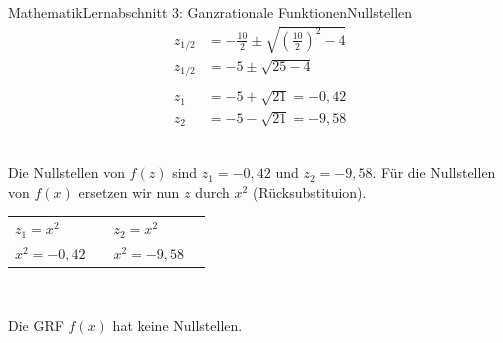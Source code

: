 \documentclass[11pt,twocolumn,oneside,openany,headings=optiontotoc,11pt,numbers=noenddot]{article}
\begin{document}
\begin{worksheet}{Mathematik}{Lernabschnitt 3: Ganzrationale Funktionen}{Nullstellen}
\begin{align*}
		z_{1/2} & = -\frac{10}{2} \pm \sqrt{\left(\frac{10}{2}\right)^2 - 4}\\
		z_{1/2} & = -5 \pm \sqrt{25 - 4}\\
		\\
		z_1 & = -5 + \sqrt{21} = -0,42\\
		z_2 & = -5 - \sqrt{21} = -9,58
		\end{align*}\\
		\par\noindent
		Die Nullstellen von \(f(z)\) sind \(z_1=-0,42\) und \(z_2=-9,58\). Für die Nullstellen von \(f(x)\) ersetzen wir nun \(z\) durch \(x^2\) (Rücksubstituion).\\
		\par\noindent
		\begin{tabularx}{0.48\textwidth}{Ml|Ml}
			\(z_1 = x^2\) & & \(z_2 = x^2\) &\\
			\(x^2 = -0,42\) & \lightning & \(x^2 = -9,58\) & \lightning\\
		\end{tabularx}\\	
		\par\noindent
		Die GRF \(f(x)\) hat keine Nullstellen.\\

\end{worksheet}
\end{document}
